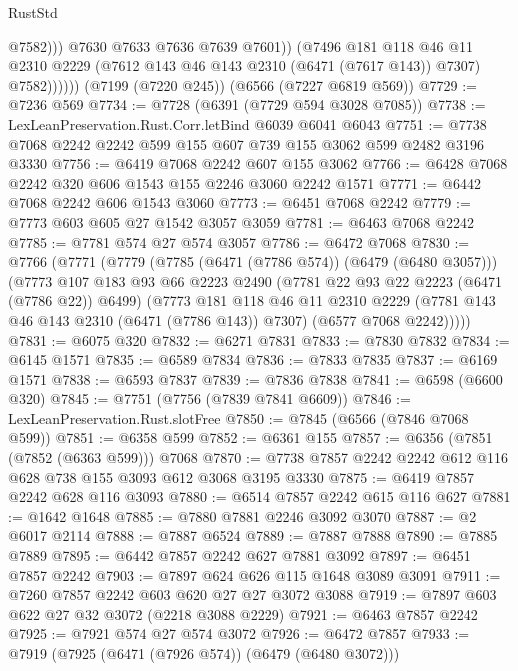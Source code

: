 \begin{lexlean}{RustStd}
\begin{coremodule}
{\begin{coremodule}
{{{{{{{{{{{{{{{{{{{{{{{{{{                        @7582)))
                  @7630
                  @7633
                  @7636
                  @7639
                  @7601))
              (@7496
                @181
                @118
                @46
                @11
                @2310
                @2229
                (@7612 @143 @46 @143 @2310 (@6471 (@7617 @143)) @7307)
                @7582))))))
    (@7199 (@7220 @245))
    (@6566 (@7227 @6819 @569))
@7729 := @7236 @569
@7734 := @7728 (@6391 (@7729 @594 @3028 @7085))
@7738 := LexLeanPreservation.Rust.Corr.letBind @6039 @6041 @6043
@7751 := @7738 @7068 @2242 @2242 @599 @155 @607 @739 @155 @3062 @599 @2482 @3196 @3330
@7756 := @6419 @7068 @2242 @607 @155 @3062
@7766 := @6428 @7068 @2242 @320 @606 @1543 @155 @2246 @3060 @2242 @1571
@7771 := @6442 @7068 @2242 @606 @1543 @3060
@7773 := @6451 @7068 @2242
@7779 := @7773 @603 @605 @27 @1542 @3057 @3059
@7781 := @6463 @7068 @2242
@7785 := @7781 @574 @27 @574 @3057
@7786 := @6472 @7068
@7830 := @7766
    (@7771
      (@7779
        (@7785 (@6471 (@7786 @574)) (@6479 (@6480 @3057)))
        (@7773
          @107
          @183
          @93
          @66
          @2223
          @2490
          (@7781 @22 @93 @22 @2223 (@6471 (@7786 @22)) @6499)
          (@7773
            @181
            @118
            @46
            @11
            @2310
            @2229
            (@7781 @143 @46 @143 @2310 (@6471 (@7786 @143)) @7307)
            (@6577 @7068 @2242)))))
@7831 := @6075 @320
@7832 := @6271 @7831
@7833 := @7830 @7832
@7834 := @6145 @1571
@7835 := @6589 @7834
@7836 := @7833 @7835
@7837 := @6169 @1571
@7838 := @6593 @7837
@7839 := @7836 @7838
@7841 := @6598 (@6600 @320)
@7845 := @7751 (@7756 (@7839 @7841 @6609))
@7846 := LexLeanPreservation.Rust.slotFree
@7850 := @7845 (@6566 (@7846 @7068 @599))
@7851 := @6358 @599
@7852 := @6361 @155
@7857 := @6356 (@7851 (@7852 (@6363 @599))) @7068
@7870 := @7738 @7857 @2242 @2242 @612 @116 @628 @738 @155 @3093 @612 @3068 @3195 @3330
@7875 := @6419 @7857 @2242 @628 @116 @3093
@7880 := @6514 @7857 @2242 @615 @116 @627
@7881 := @1642 @1648
@7885 := @7880 @7881 @2246 @3092 @3070
@7887 := @2 @6017 @2114
@7888 := @7887 @6524
@7889 := @7887 @7888
@7890 := @7885 @7889
@7895 := @6442 @7857 @2242 @627 @7881 @3092
@7897 := @6451 @7857 @2242
@7903 := @7897 @624 @626 @115 @1648 @3089 @3091
@7911 := @7260 @7857 @2242 @603 @620 @27 @27 @3072 @3088
@7919 := @7897 @603 @622 @27 @32 @3072 (@2218 @3088 @2229)
@7921 := @6463 @7857 @2242
@7925 := @7921 @574 @27 @574 @3072
@7926 := @6472 @7857
@7933 := @7919 (@7925 (@6471 (@7926 @574)) (@6479 (@6480 @3072)))
}}}}}}}}}}}}}}}}}}}}}}}}}}
\end{coremodule}}
\end{coremodule}
\end{lexlean}

